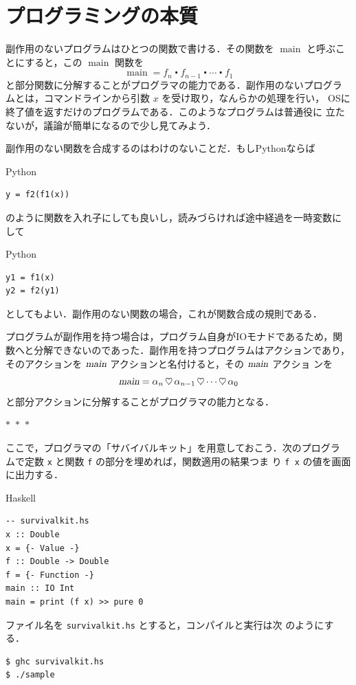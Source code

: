 \documentclass[a5paper,twoside,fleqn,draft]{jsbook}
\newcommand{\separator}{\begin{center}$*$~$*$~$*$\end{center}}
\newcommand{\programminglanguage}[1]{\textsf{#1}}
\newcommand{\haskell}{\programminglanguage{Haskell}}
\newcommand{\python}{\programminglanguage{Python}}
\newcommand{\code}[1]{\texttt{#1}}
\newcommand{\filename}[1]{\texttt{#1}}
\newenvironment{haskellcode}{\begin{itembox}[r]{\haskell}}{\end{itembox}}
\newenvironment{pythoncode}{\begin{itembox}[r]{\python}}{\end{itembox}}
\newcommand{\mSpecialFunc}[1]{#1}
\DeclareMathOperator{\mMainFunc}{\mSpecialFunc{main}}
\newcommand{\mAction}[1]{\textsl{#1}}
\DeclareMathOperator{\mMain}{\mAction{main}}
\DeclareMathOperator{\mBind}{\heartsuit}
\DeclareMathOperator{\mComp}{\centerdot}
\begin{document}
\section{プログラミングの本質}

副作用のないプログラムはひとつの関数で書ける．その関数を $\mMainFunc$
と呼ぶことにすると，この $\mMainFunc$ 関数を
\begin{equation}
\mMainFunc=f_n\mComp f_{n-1}\mComp\dotsb\mComp f_1
\end{equation}
と部分関数に分解することがプログラマの能力である．副作用のないプログラ
ムとは，コマンドラインから引数 $x$ を受け取り，なんらかの処理を行い，
OSに終了値を返すだけのプログラムである．このようなプログラムは普通役に
立たないが，議論が簡単になるので少し見てみよう．

副作用のない関数を合成するのはわけのないことだ．もし\python ならば
\begin{pythoncode}
\begin{verbatim}
y = f2(f1(x))
\end{verbatim}
\end{pythoncode}
のように関数を入れ子にしても良いし，読みづらければ途中経過を一時変数に
して
\begin{pythoncode}
\begin{verbatim}
y1 = f1(x)
y2 = f2(y1)
\end{verbatim}
\end{pythoncode}
としてもよい．副作用のない関数の場合，これが関数合成の規則である．

プログラムが副作用を持つ場合は，プログラム自身がIOモナドであるため，関
数へと分解できないのであった．副作用を持つプログラムはアクションであり，
そのアクションを $\mMain$ アクションと名付けると，その $\mMain$ アクショ
ンを
\begin{equation}
\mMain=\alpha_n\mBind\alpha_{n-1}\mBind\dotsb\mBind\alpha_0
\end{equation}
と部分アクションに分解することがプログラマの能力となる．


\separator

ここで，プログラマの「サバイバルキット」を用意しておこう．次のプログラ
ムで定数 \code{x} と関数 \code{f} の部分を埋めれば，関数適用の結果つま
り \code{f x} の値を画面に出力する．
\begin{haskellcode}
\begin{verbatim}
-- survivalkit.hs
x :: Double
x = {- Value -}
f :: Double -> Double
f = {- Function -}
main :: IO Int
main = print (f x) >> pure 0
\end{verbatim}
\end{haskellcode}
ファイル名を \filename{survivalkit.hs} とすると，コンパイルと実行は次
のようにする．
\begin{verbatim}
$ ghc survivalkit.hs
$ ./sample
\end{verbatim}%
\end{document}
